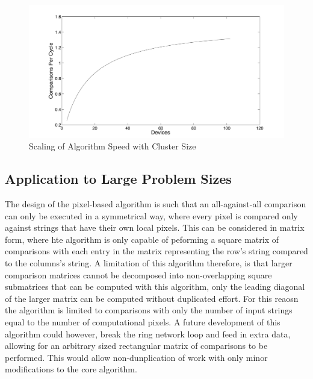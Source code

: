 \documentclass[conference]{IEEEtran}
\begin{document}
\begin{figure}[!h]
  \centering
  \includegraphics[width=0.9\columnwidth]{./figs/scalability.pdf}
  \caption{Scaling of Algorithm Speed with Cluster Size}
    \label{fig:scale}
\end{figure}

\subsection{Application to Large Problem Sizes}

The design of the pixel-based algorithm is such that an all-against-all comparison can only be executed in a symmetrical way, where every pixel is compared only against strings that have their own local pixels. This can be considered in matrix form, where hte algorithm is only capable of peforming a square matrix of comparisons with each entry in the matrix representing the row's string compared to the columns's string. A limitation of this algorithm therefore, is that larger comparison matrices cannot be decomposed into non-overlapping square submatrices that can be computed with this algorithm, only the leading diagonal of the larger matrix can be computed without duplicated effort. For this reaosn the algorithm is limited to comparisons with only the number of input strings equal to the number of computational pixels. A future development of this algorithm could however, break the ring network loop and feed in extra data, allowing for an arbitrary sized rectangular matrix of comparisons to be performed. This would allow non-dunplication of work with only minor modifications to the core algorithm.

%
\end{document}
